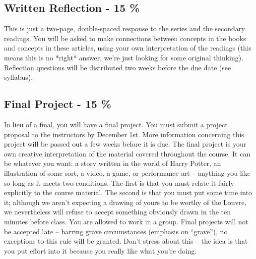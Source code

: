 \documentclass{article}
\begin{document}
\subsection*{Written Reflection - 15 \%}		
	This is just a two-page, double-spaced response to the series and the secondary readings. You will be asked to make connections between concepts in the books and concepts in these articles, using your own interpretation of the readings (this means this is no *right* answer, we’re just looking for some original thinking). Reflection questions will be distributed two weeks before the due date (see syllabus).

\subsection*{Final Project - 15 \%}		
    In lieu of a final, you will have a final project. You must submit a project proposal to the instructors by December 1st. More information concerning this project will be passed out a few weeks before it is due. The final project is your own creative interpretation of the material covered throughout the course.  It can be whatever you want: a story written in the world of Harry Potter, an illustration of some sort, a video, a game, or performance art – anything you like so long as it meets two conditions.  The first is that you must relate it fairly explicitly to the course material. The second is that you must put some time into it; although we aren't expecting a drawing of yours to be worthy of the Louvre, we nevertheless will refuse to accept something obviously drawn in the ten minutes before class. You are allowed to work in a group. Final projects will not be accepted late – barring grave circumstances (emphasis on “grave”), no exceptions to this rule will be granted. Don’t stress about this – the idea is that you put effort into it because you really like what you’re doing.
\end{document}
